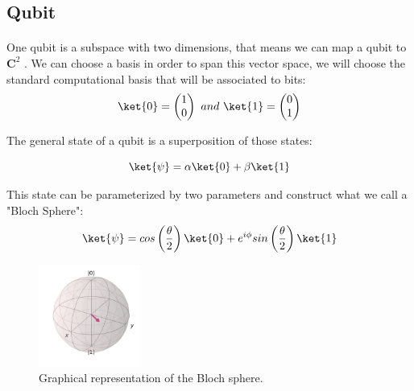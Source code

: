 \subsection{Qubit}
\label{Subsec: Qubit}

\paragraph{}One qubit is a subspace with two dimensions, that means we can map a qubit to $\mathbf{C}^2$ . We can choose a basis in order to span this vector space, we will choose the standard computational basis that will be associated to bits:
\begin{equation}
\label{Eq: Computational Basis}
\ket{0} =  
\begin{pmatrix} 
1 \\
0 \\
\end{pmatrix}
\
and
\
\ket{1} =  
\begin{pmatrix} 
0 \\
1 \\
\end{pmatrix}
\end{equation}

The general state of a qubit is a superposition of those states:

\begin{equation}
\label{Eq: Superposition of qubit}
\ket{\psi} = \alpha \ket{0} + \beta \ket{1}
\end{equation}

This state can be parameterized by two parameters and construct what we call a "Bloch Sphere":
\begin{equation}
\label{Eq: Bloch Sphere}
\ket{\psi} = cos\left(\frac{\theta}{2} \right) \ket{0} + e^{i\phi}sin\left(\frac{\theta}{2} \right) \ket{1}
\end{equation}

\begin{figure}[H]
\centering
\includegraphics[width=0.3\textwidth]{Figures/bloch.png}
\caption{Graphical representation of the Bloch sphere.}
\end{figure}